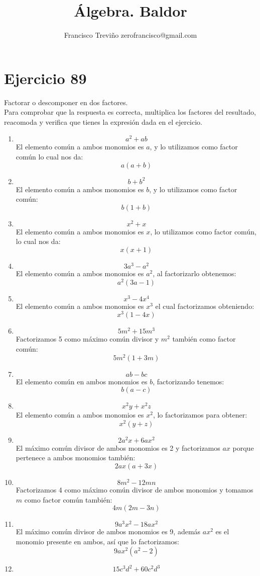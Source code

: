 \documentclass[12pt]{article}
\title{Álgebra. Baldor}
\author{Francisco Treviño zerofrancisco@gmail.com}
\begin{document}
\maketitle

\section*{Ejercicio 89}
Factorar o descomponer en dos factores.\\
Para comprobar que la respuesta es correcta, multiplica los factores del resultado, reacomoda y verifica que tienes la expresión dada en el ejercicio.

\begin{enumerate}[label=\bfseries Ejercicio \arabic*:]
  \item $$a^2 + ab$$
El elemento común a ambos monomios es $a$, y lo utilizamos como factor común lo cual nos da:
$$a(a + b)$$
  \item $$b + b^2$$
El elemento común a ambos monomios es $b$, y lo utilizamos como factor común:
$$b(1+b)$$
  \item $$x^2 + x$$
El elemento común a ambos monomios es $x$, lo utilizamos como factor común, lo cual nos da:
$$x(x+1)$$
  \item $$3a^3 - a^2$$
El elemento común a ambos monomios es $a^2$, al factorizarlo obtenemos:
$$a^2(3a - 1)$$
  \item $$x^3 - 4x^4$$
El elemento común a ambos monomios es $x^3$ el cual factorizamos obteniendo:
$$x^3(1 - 4x)$$
  \item $$5m^2 + 15m^3$$
Factorizamos 5 como máximo común divisor y $m^2$ también como factor común:
$$5m^2(1 + 3m)$$
  \item $$ab - bc$$
El elemento común en ambos monomios es $b$, factorizando tenemos:
$$b(a-c)$$
  \item $$x^2y + x^2z$$
El elemento común a ambos monomios es $x^2$, lo factorizamos para obtener:
$$x^2(y + z)$$
  \item $$2a^2x + 6ax^2$$
El máximo común divisor de ambos monomios es 2 y factorizamos $ax$ porque pertenece a ambos monomios también:
$$2ax(a + 3x)$$
  \item $$8m^2 - 12mn$$
Factorizamos 4 como máximo común divisor de ambos monomios y tomamos $m$ como factor común también:
$$4m(2m - 3n)$$
  \item $$9a^3x^2 - 18ax^2$$
El máximo común divisor de ambos monomios es 9, además $ax^2$ es el monomio presente en ambos, así que lo factorizamos:
$$9ax^2(a^2 -2)$$
  \item $$15c^3d^2 + 60c^2d^3$$

\end{enumerate}
\end{document}
